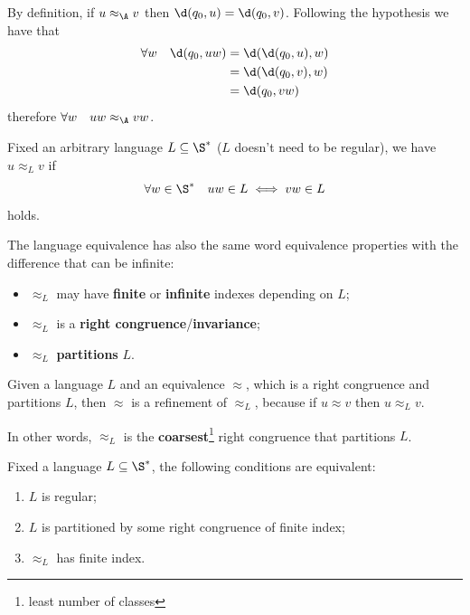 \documentclass[oneside]{academica}
\begin{document}
\begin{proof*}
  By definition, if $u \approx_{\A} v$ then $\d(q_0,u) = \d(q_0,v)$.
  Following the hypothesis we have that
  \begin{align*}
    \forall w \quad \d(q_0,uw) &= \d(\d(q_0,u),w)\\
    &= \d(\d(q_0,v),w)\\
    &= \d(q_0,vw)
  \end{align*}
  therefore $\forall w \quad uw \approx_{\A} vw$.
\end{proof*}

\begin{definition*}
  Fixed an arbitrary language $L \subseteq \S^*$ ($L$ doesn't need to be regular), we have $u \approx_{L} v$ if
  \begin{equation*}
    \forall w \in \S^* \quad uw \in L \iff vw \in L
  \end{equation*}
  holds.
\end{definition*}

The language equivalence has also the same word equivalence properties with the difference that can be infinite:
\begin{itemize}
  \item $\approx_{L}$ may have \textbf{finite} or \textbf{infinite} indexes depending on $L$;
  \item $\approx_{L}$ is a \textbf{right congruence}/\textbf{invariance};
  \item $\approx_{L}$ \textbf{partitions} $L$.
\end{itemize}

\begin{lemma*}
  Given a language $L$ and an equivalence $\approx$, which is a right congruence and partitions $L$, then $\approx$ is a refinement of $\approx_L$, because if $u \approx v$ then $u \approx_L v$.

  \medskip
  In other words, $\approx_L$ is the \textbf{coarsest}\footnote{least number of classes} right congruence that partitions $L$.
\end{lemma*}

\begin{theorem}\label{thm:myhill_nerode}
  Fixed a language $L \subseteq \S^*$, the following conditions are equivalent:
  \begin{enumerate}
    \item $L$ is regular;
    \item $L$ is partitioned by some right congruence of finite index;
    \item $\approx_L$ has finite index.
  \end{enumerate}
\end{theorem}
\end{document}
